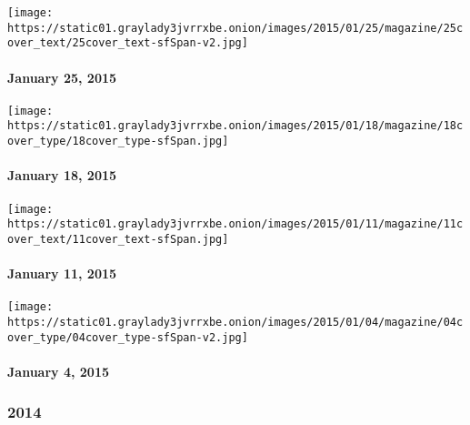 \href{http://www.nytimes3xbfgragh.onion/indexes/2015/01/25/magazine/index.html}{}

\texttt{[image: https://static01.graylady3jvrrxbe.onion/images/2015/01/25/magazine/25cover\_text/25cover\_text-sfSpan-v2.jpg]}

\hypertarget{january-25-2015}{%
\paragraph{January 25, 2015}\label{january-25-2015}}

\href{http://www.nytimes3xbfgragh.onion/indexes/2015/01/18/magazine/index.html}{}

\texttt{[image: https://static01.graylady3jvrrxbe.onion/images/2015/01/18/magazine/18cover\_type/18cover\_type-sfSpan.jpg]}

\hypertarget{january-18-2015}{%
\paragraph{January 18, 2015}\label{january-18-2015}}

\href{http://www.nytimes3xbfgragh.onion/indexes/2015/01/11/magazine/index.html}{}

\texttt{[image: https://static01.graylady3jvrrxbe.onion/images/2015/01/11/magazine/11cover\_text/11cover\_text-sfSpan.jpg]}

\hypertarget{january-11-2015}{%
\paragraph{January 11, 2015}\label{january-11-2015}}

\href{http://www.nytimes3xbfgragh.onion/indexes/2015/01/04/magazine/index.html}{}

\texttt{[image: https://static01.graylady3jvrrxbe.onion/images/2015/01/04/magazine/04cover\_type/04cover\_type-sfSpan-v2.jpg]}

\hypertarget{january-4-2015}{%
\paragraph{January 4, 2015}\label{january-4-2015}}

\hypertarget{2014}{%
\subsubsection{2014}\label{2014}}

\href{http://www.nytimes3xbfgragh.onion/indexes/2014/12/27/magazine/index.html}{}

